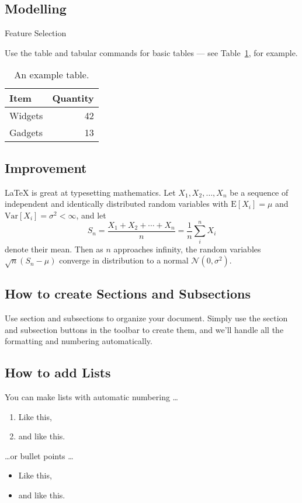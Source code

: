 \documentclass[a4paper]{article}
\begin{document}
\subsection{Modelling}
 
 Feature Selection
 
Use the table and tabular commands for basic tables --- see Table~\ref{tab:widgets}, for example. 

\begin{table}
\centering
\begin{tabular}{l|r}
Item & Quantity \\\hline
Widgets & 42 \\
Gadgets & 13
\end{tabular}
\caption{\label{tab:widgets}An example table.}
\end{table}

\subsection{Improvement }

\LaTeX{} is great at typesetting mathematics. Let $X_1, X_2, \ldots, X_n$ be a sequence of independent and identically distributed random variables with $\text{E}[X_i] = \mu$ and $\text{Var}[X_i] = \sigma^2 < \infty$, and let
\[S_n = \frac{X_1 + X_2 + \cdots + X_n}{n}
      = \frac{1}{n}\sum_{i}^{n} X_i\]
denote their mean. Then as $n$ approaches infinity, the random variables $\sqrt{n}(S_n - \mu)$ converge in distribution to a normal $\mathcal{N}(0, \sigma^2)$.


\subsection{How to create Sections and Subsections}

Use section and subsections to organize your document. Simply use the section and subsection buttons in the toolbar to create them, and we'll handle all the formatting and numbering automatically.

\subsection{How to add Lists}

You can make lists with automatic numbering \dots

\begin{enumerate}
\item Like this,
\item and like this.
\end{enumerate}
\dots or bullet points \dots
\begin{itemize}
\item Like this,
\item and like this.
\end{itemize}
\end{document}
